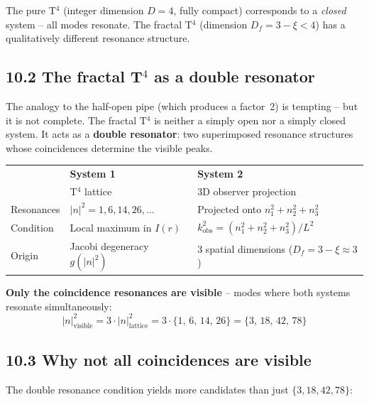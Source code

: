 The pure T$^4$ (integer dimension $D=4$, fully compact)
corresponds to a \emph{closed} system -- all modes resonate.
The fractal T$^4$ (dimension $D_f = 3-\xi < 4$) has a
qualitatively different resonance structure.

\subsection*{10.2 The fractal T$^4$ as a double resonator}

The analogy to the half-open pipe (which produces a factor~2) is
tempting -- but it is not complete. The fractal T$^4$ is
neither a simply open nor a simply closed system. It acts
as a \textbf{double resonator}: two superimposed resonance structures
whose coincidences determine the visible peaks.

\begin{center}
\begin{tabular}{p{3cm}p{5cm}p{5cm}}
\toprule
 & \textbf{System 1} & \textbf{System 2} \\
 & T$^4$ lattice & 3D observer projection \\
\midrule
Resonances & $|n|^2 = 1, 6, 14, 26, \ldots$ &
  Projected onto $n_1^2+n_2^2+n_3^2$ \\
Condition & Local maximum in $I(r)$ &
  $k_\mathrm{obs}^2 = (n_1^2+n_2^2+n_3^2)/L^2$ \\
Origin & Jacobi degeneracy $g(|n|^2)$ &
  3 spatial dimensions ($D_f = 3-\xi \approx 3$) \\
\bottomrule
\end{tabular}
\end{center}

\textbf{Only the coincidence resonances are visible} -- modes where
both systems resonate simultaneously:
\[
  |n|^2_\mathrm{visible}
  = 3 \cdot |n|^2_\mathrm{lattice}
  = 3 \cdot \{1,\,6,\,14,\,26\}
  = \{3,\,18,\,42,\,78\}
\]

\subsection*{10.3 Why not all coincidences are visible}

The double resonance condition yields more candidates than just
$\{3, 18, 42, 78\}$:

